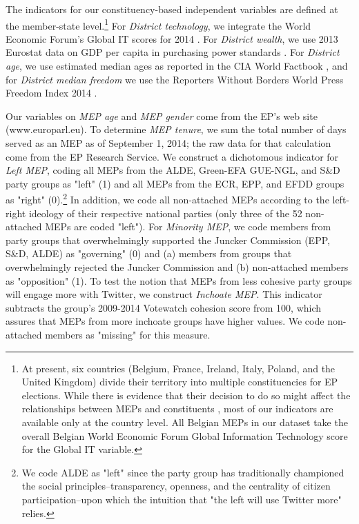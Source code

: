 \documentclass[12pt]{article}\usepackage[]{graphicx}\usepackage[]{color}
\begin{document}
    The indicators for our constituency-based independent variables are defined at the member-state level.\footnote{At present, six countries (Belgium, France, Ireland, Italy, Poland, and the United Kingdom) divide their territory into multiple constituencies for EP elections. While there is evidence that their decision to do so might affect the relationships between MEPs and constituents \cite{bowler.farrell.1993, hix.2004}, most of our indicators are available only at the country level. All Belgian MEPs in our dataset take the overall Belgian World Economic Forum Global Information Technology score for the Global IT variable.} For \emph{District technology}, we integrate the World Economic Forum's Global IT scores for 2014 \cite{bilbao-osorio.dutta.lanvin.2014}. For \emph{District wealth}, we use 2013 Eurostat data on GDP per capita in purchasing power standards \cite{eurostat.2014}. For \emph{District age}, we use estimated median ages as reported in the CIA World Factbook \cite{cia.2014}, and for \emph{District median freedom} we use the Reporters Without Borders World Press Freedom Index 2014 \cite{rsf.2014}.
    
    Our variables on \emph{MEP age} and \emph{MEP gender} come from the EP's web site (www.europarl.eu). To determine \emph{MEP tenure}, we sum the total number of days served as an MEP as of September 1, 2014; the raw data for that calculation come from the EP Research Service. We construct a dichotomous indicator for \emph{Left MEP}, coding all MEPs from the ALDE, Green-EFA GUE-NGL, and S\&D party groups as "left" (1) and all MEPs from the ECR, EPP, and EFDD groups as "right" (0).\footnote{We code ALDE as "left" since the party group has traditionally championed the social principles--transparency, openness, and the centrality of citizen participation--upon which the intuition that "the left will use Twitter more" relies.} In addition, we code all non-attached MEPs according to the left-right ideology of their respective national parties (only three of the 52 non-attached MEPs are coded "left"). For \emph{Minority MEP}, we code members from party groups that overwhelmingly supported the Juncker Commission (EPP, S\&D, ALDE) as "governing" (0) and (a) members from groups that overwhelmingly rejected the Juncker Commission and (b) non-attached members as "opposition" (1). To test the notion that MEPs from less cohesive party groups will engage more with Twitter, we construct \emph{Inchoate MEP}. This indicator subtracts the group's 2009-2014 Votewatch cohesion score \cite{thillaye.2014} from 100, which assures that MEPs from more inchoate groups have higher values. We code non-attached members as "missing" for this measure.
    
\end{document}

